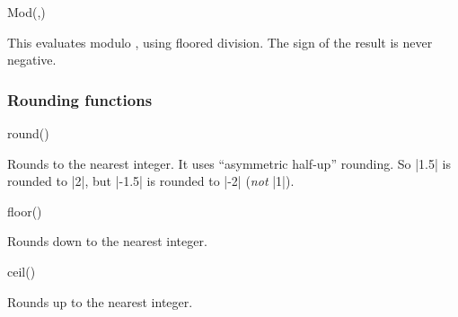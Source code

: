 \begin{math-function}{Mod(,)}
\mathcommand

	This evaluates  modulo , using floored division.
	The sign of the result is never negative.

\begin{codeexample}[]
 \pgfmathresult
\end{codeexample}

\end{math-function}





\subsubsection{Rounding functions}

\label{pgfmath-functions-rounding}

\begin{math-function}{round()}
\mathcommand

	Rounds  to the nearest integer. It uses ``asymmetric half-up'' 
	rounding. So |1.5| is rounded to |2|, but |-1.5| is rounded to |-2| 
	(\emph{not} |1|).

\begin{codeexample}[]
 \pgfmathresult
\end{codeexample}

\begin{codeexample}[]
 \pgfmathresult
\end{codeexample}

\end{math-function}

\begin{math-function}{floor()}
\mathcommand

	Rounds  down to the nearest integer. 
	
\begin{codeexample}[]
 \pgfmathresult
\end{codeexample}

\begin{codeexample}[]
 \pgfmathresult
\end{codeexample}

\end{math-function}

\begin{math-function}{ceil()}
\mathcommand

	Rounds  up to the nearest integer. 

\begin{codeexample}[]
 \pgfmathresult
\end{codeexample}

\begin{codeexample}[]
 \pgfmathresult
\end{codeexample}

\end{math-function}

